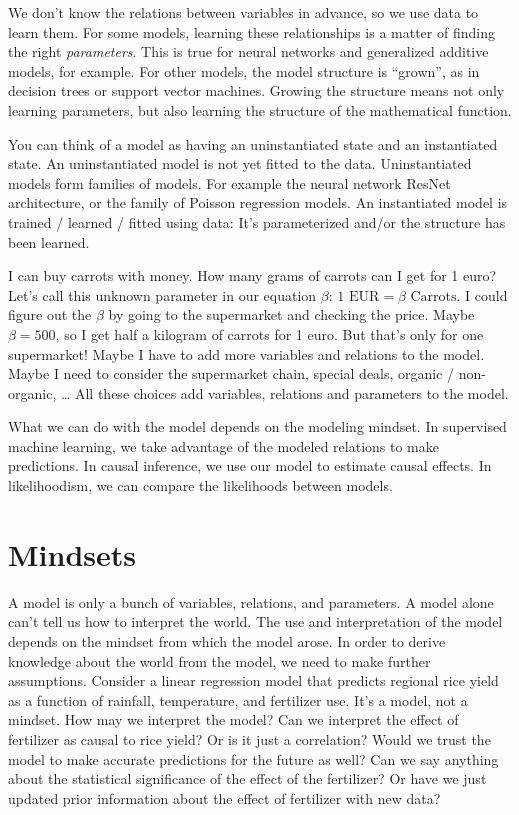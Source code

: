 \documentclass[
  10pt,
]{scrbook}
\begin{document}
We don't know the relations between variables in advance, so we use data to learn them.
For some models, learning these relationships is a matter of finding the right \emph{parameters}.
This is true for neural networks and generalized additive models, for example.
For other models, the model structure is ``grown'', as in decision trees or support vector machines.
Growing the structure means not only learning parameters, but also learning the structure of the mathematical function.

You can think of a model as having an uninstantiated state and an instantiated state.
An uninstantiated model is not yet fitted to the data.
Uninstantiated models form families of models.
For example the neural network ResNet architecture, or the family of Poisson regression models.
An instantiated model is trained / learned / fitted using data: It's parameterized and/or the structure has been learned.

I can buy carrots with money.
How many grams of carrots can I get for 1 euro?
Let's call this unknown parameter in our equation \(\beta\):
\(1 \text{ EUR} = \beta \text{ Carrots}\).
I could figure out the \(\beta\) by going to the supermarket and checking the price.
Maybe \(\beta = 500\), so I get half a kilogram of carrots for 1 euro.
But that's only for one supermarket!
Maybe I have to add more variables and relations to the model.
Maybe I need to consider the supermarket chain, special deals, organic / non-organic, \ldots{}
All these choices add variables, relations and parameters to the model.

What we can do with the model depends on the modeling mindset.
In supervised machine learning, we take advantage of the modeled relations to make predictions.
In causal inference, we use our model to estimate causal effects.
In likelihoodism, we can compare the likelihoods between models.

\hypertarget{mindsets}{%
\chapter{Mindsets}\label{mindsets}}

A model is only a bunch of variables, relations, and parameters.
A model alone can't tell us how to interpret the world.
The use and interpretation of the model depends on the mindset from which the model arose.
In order to derive knowledge about the world from the model, we need to make further assumptions.
Consider a linear regression model that predicts regional rice yield as a function of rainfall, temperature, and fertilizer use.
It's a model, not a mindset.
How may we interpret the model?
Can we interpret the effect of fertilizer as causal to rice yield? Or is it just a correlation?
Would we trust the model to make accurate predictions for the future as well?
Can we say anything about the statistical significance of the effect of the fertilizer?
Or have we just updated prior information about the effect of fertilizer with new data?
\end{document}
